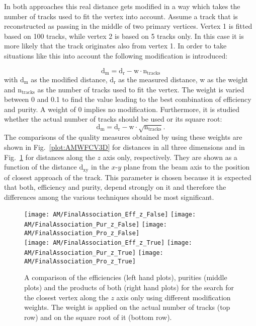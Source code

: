 In both approaches this real distance gets modified in a way which takes the number of tracks used to fit the vertex into account. Assume a track that is reconstructed as passing in the middle of two primary vertices. Vertex 1 is fitted based on 100 tracks, while vertex 2 is based on 5 tracks only. In this case it is more likely that the track originates also from vertex 1. In order to take situations like this into account the following modification is introduced:

\begin{displaymath}
    \textrm{d}_{\textrm{m}} = \textrm{d}_{\textrm{r}}- \textrm{w} \cdot \textrm{n}_{\textrm{tracks}}
\end{displaymath}
with $\textrm{d}_{\textrm{m}}$ as the modified distance, $\textrm{d}_{\textrm{r}}$ as the measured distance, w as the weight and $\textrm{n}_{\textrm{tracks}}$ as the number of tracks used to fit the vertex. The weight is varied between 0 and 0.1 to find the value leading to the best combination of efficiency and purity. A weight of 0 implies no modification. Furthermore, it is studied whether the actual number of tracks should be used or its square root:
\begin{displaymath}
    \textrm{d}_{\textrm{m}} = \textrm{d}_{\textrm{r}}- \textrm{w} \cdot \sqrt{\textrm{n}_{\textrm{tracks}}}.
\end{displaymath}
The comparisons of the quality measures obtained by using these weights are shown in Fig.~\ref{plot:AMWFCV3D} for distances in all three dimensions and in Fig.~\ref{plot:AMWFCVZ} for distances along the $z$ axis only, respectively. They are shown as a function of the distance $\textrm{d}_{\textrm{xy}}$ in the $x$-$y$ plane from the beam axis to the position of closest approach of the track. This parameter is chosen because it is expected that both, efficiency and purity, depend strongly on it and therefore the differences among the various techniques should be most significant.

\begin{figure}[Ht]
    \centering
    \texttt{[image: AM/FinalAssociation\_Eff\_z\_False]}
    \texttt{[image: AM/FinalAssociation\_Pur\_z\_False]}
    \texttt{[image: AM/FinalAssociation\_Pro\_z\_False]}
    \\
    \texttt{[image: AM/FinalAssociation\_Eff\_z\_True]}
    \texttt{[image: AM/FinalAssociation\_Pur\_z\_True]}
    \texttt{[image: AM/FinalAssociation\_Pro\_z\_True]}
    \caption[Efficiencies, purities and their product using different modification weights for the search along $z$ axis only.]{A comparison of the efficiencies (left hand plots), purities (middle plots) and the products of both (right hand plots) for the search for the closest vertex along the $z$ axis only using different modification weights. The weight is applied on the actual number of tracks (top row) and on the square root of it (bottom row).\label{plot:AMWFCVZ}}
\end{figure}


